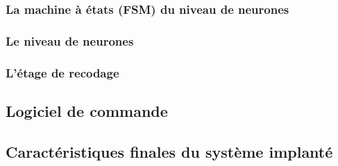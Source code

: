 \subsubsection{La machine à états (FSM) du niveau de neurones}
\subsubsection{Le niveau de neurones}
\subsubsection{L'étage de recodage}

\subsection{Logiciel de commande}

\subsection{Caractéristiques finales du système implanté}























